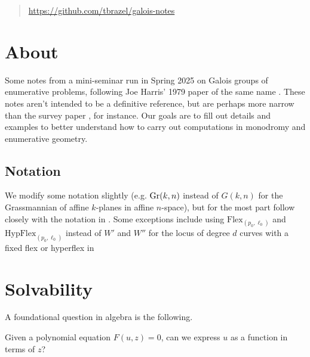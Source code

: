 \documentclass[11pt]{amsart}
\providecommand{\Flex}{\mathrm{Flex}}
\providecommand{\HypFlex}{\mathrm{HypFlex}}
\begin{document}
\begin{abstract} \href{https://github.com/tbrazel/galois-notes}{https://github.com/tbrazel/galois-notes}
\end{abstract}

\maketitle



\setcounter{section}{-1}
\section{About}

Some notes from a mini-seminar run in Spring 2025 on Galois groups of enumerative problems, following Joe Harris' 1979 paper of the same name \cite{Harris-Galois}. These notes aren't intended to be a definitive reference, but are perhaps more narrow than the survey paper \cite{SottileYahl}, for instance. Our goals are to fill out details and examples to better understand how to carry out computations in monodromy and enumerative geometry.

\subsection{Notation}

We modify some notation slightly (e.g. $\mathrm{Gr}(k,n)$ instead of $G(k,n)$ for the Grassmannian of affine $k$-planes in affine $n$-space), but for the most part follow closely with the notation in \cite{Harris-Galois}. Some exceptions include using $\Flex_{(p_0,\ell_0)}$ and $\HypFlex_{(p_0,\ell_0)}$ instead of $W'$ and $W''$ for the locus of degree $d$ curves with a fixed flex or hyperflex in 

\section{Solvability}

A foundational question in algebra is the following.

\begin{question}\label{solvable-bivariate-polynomial} 
Given a polynomial equation $F(u,z)=0$, can we express $u$ as a function in terms of $z$?
\end{question}
\end{document}
